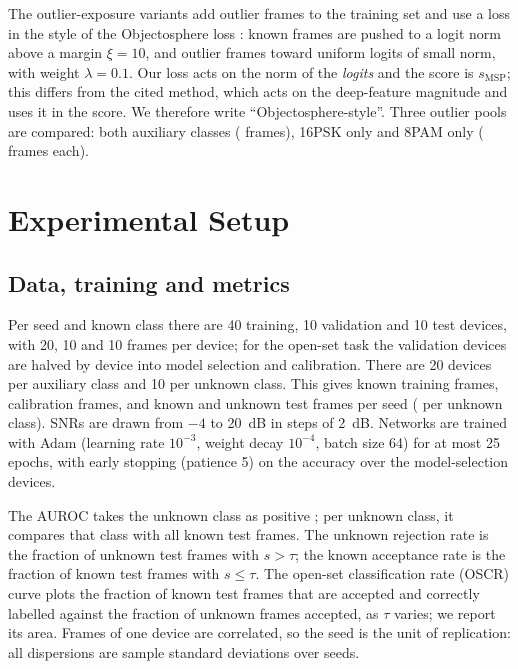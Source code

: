 \documentclass[journal]{IEEEtran}
\begin{document}
The outlier-exposure variants add outlier frames to the training set and use
a loss in the style of the Objectosphere loss
\cite{dhamija2018objectosphere}: known frames are pushed to a logit norm
above a margin $\xi=10$, and outlier frames toward uniform logits of small
norm, with weight $\lambda=0.1$. Our loss acts on the norm of the
\emph{logits} and the score is $s_\mathrm{MSP}$; this differs from the cited
method, which acts on the deep-feature magnitude and uses it in the score. We
therefore write ``Objectosphere-style''. Three outlier pools are compared:
both auxiliary classes ( frames), 16PSK only
and 8PAM only ( frames each).

\section{Experimental Setup}
\label{sec:setup}
\subsection{Data, training and metrics}
Per seed and known class there are 40 training, 10 validation and 10 test
devices, with 20, 10 and 10 frames per device; for the open-set task the
validation devices are halved by device into model selection and
calibration. There are 20 devices per auxiliary class and 10 per unknown
class. This gives  known training frames,
 calibration frames, and 
known and  unknown test frames per seed
( per unknown class). SNRs are drawn from $-4$
to 20~dB in steps of 2~dB. Networks are trained with Adam (learning rate
$10^{-3}$, weight decay $10^{-4}$, batch size 64) for at most 25 epochs, with
early stopping (patience 5) on the accuracy over the model-selection devices.

The AUROC takes the unknown class as positive \cite{fawcett2006roc}; per
unknown class, it compares that class with all known test frames. The unknown
rejection rate is the fraction of unknown test frames with $s>\tau$; the
known acceptance rate is the fraction of known test frames with $s\le\tau$.
The open-set classification rate (OSCR) curve
\cite{dhamija2018objectosphere} plots the fraction of known test frames that
are accepted and correctly labelled against the fraction of unknown frames
accepted, as $\tau$ varies; we report its area. Frames of one device are
correlated, so the seed is the unit of replication: all dispersions are
sample standard deviations over seeds.
\end{document}
